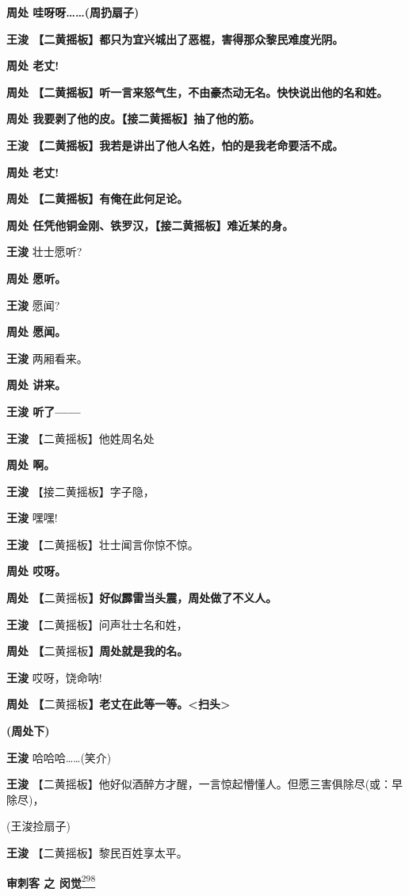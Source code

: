 \textbf{周处 哇呀呀\ldots{}\ldots{}(周扔扇子)}

\textbf{王浚 【二黄摇板】都只为宜兴城出了恶棍，害得那众黎民难度光阴。}

\textbf{周处 老丈!}

\textbf{周处
【二黄摇板】听一言来怒气生，不由豪杰动无名。快快说出他的名和姓。}

\textbf{周处 我要剥了他的皮。【接二黄摇板】抽了他的筋。}

\textbf{王浚 【二黄摇板】我若是讲出了他人名姓，怕的是我老命要活不成。}

\textbf{周处 老丈!}

\textbf{周处 【二黄摇板】有俺在此何足论。}

\textbf{周处 任凭他铜金刚、铁罗汉，【接二黄摇板】难近某的身。}

\textbf{王浚} 壮士愿听?

\textbf{周处 愿听。}

\textbf{王浚} 愿闻?

\textbf{周处 愿闻。}

\textbf{王浚} 两厢看来。

\textbf{周处 讲来。}

\textbf{王浚 听了------}

\textbf{王浚} 【二黄摇板】他姓周名处

\textbf{周处 啊。}

\textbf{王浚} 【接二黄摇板】字子隐，

\textbf{王浚} 嘿嘿!

\textbf{王浚} 【二黄摇板】壮士闻言你惊不惊。

\textbf{周处 哎呀。}

\textbf{周处 【}二黄摇板\textbf{】好似霹雷当头震，周处做了不义人。}

\textbf{王浚} 【二黄摇板】问声壮士名和姓，

\textbf{周处 【}二黄摇板\textbf{】周处就是我的名。}

\textbf{王浚} 哎呀，饶命呐!

\textbf{周处
【}二黄摇板\textbf{】老丈在此等一等。\textless{}扫头\textgreater{}}

\textbf{(周处下)}

\textbf{王浚} 哈哈哈\ldots{}\ldots{}(笑介)

\textbf{王浚}
【二黄摇板】他好似酒醉方才醒，一言惊起懵懂人。但愿三害俱除尽(或：早除尽)，

(王浚捡扇子)

\textbf{王浚} 【二黄摇板】黎民百姓享太平。

\textbf{审刺客 之 闵觉}\protect\hyperlink{fn298}{\textsuperscript{298}}


